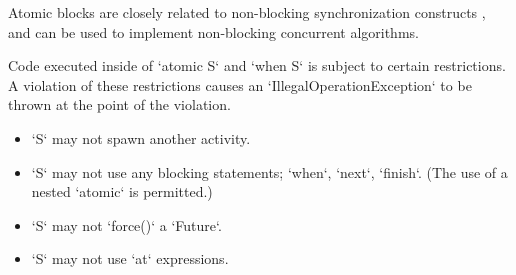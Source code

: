 
Atomic blocks are closely related to non-blocking synchronization
constructs \cite{herlihy91waitfree}, and can be used to implement 
non-blocking concurrent algorithms.

Code executed inside of \xcd`atomic S` and \xcd`when S` is subject
to certain restrictions. A violation of these restrictions causes an 
\xcd`IllegalOperationException` to be thrown at the point of the violation.

\begin{itemize}
\item \xcd`S` may not spawn another activity.
\item \xcd`S` may not use any blocking statements; \xcd`when`, \xcd`next`,
      \xcd`finish`.  (The use of a nested \xcd`atomic` is permitted.)
\item \xcd`S` may not \xcd`force()` a \xcd`Future`. 
\item \xcd`S` may not use \xcd`at` expressions.
\end{itemize}



